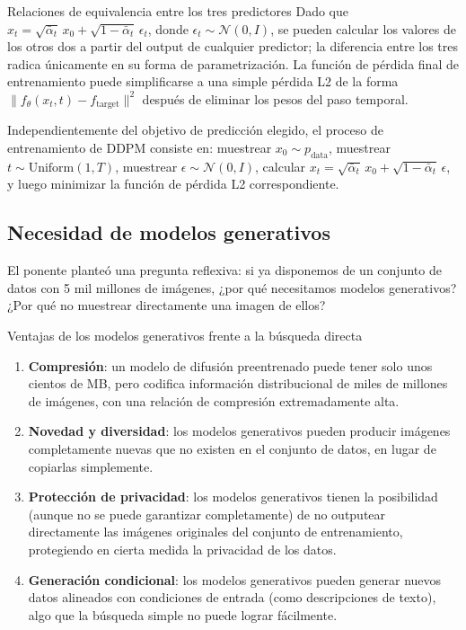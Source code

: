 \begin{knowledgebox}{Relaciones de equivalencia entre los tres predictores}
Dado que $x_t = \sqrt{\bar{\alpha}_t}\, x_0 + \sqrt{1-\bar{\alpha}_t}\, \epsilon_t$, donde $\epsilon_t \sim \mathcal{N}(0, I)$, se pueden calcular los valores de los otros dos a partir del output de cualquier predictor; la diferencia entre los tres radica únicamente en su forma de parametrización. La función de pérdida final de entrenamiento puede simplificarse a una simple pérdida L2 de la forma $\|f_\theta(x_t, t) - f_{\text{target}}\|^2$ después de eliminar los pesos del paso temporal.
\end{knowledgebox}

Independientemente del objetivo de predicción elegido, el proceso de entrenamiento de DDPM consiste en: muestrear $x_0 \sim p_{\text{data}}$, muestrear $t \sim \text{Uniform}(1,T)$, muestrear $\epsilon \sim \mathcal{N}(0,I)$, calcular $x_t = \sqrt{\bar{\alpha}_t}\, x_0 + \sqrt{1-\bar{\alpha}_t}\, \epsilon$, y luego minimizar la función de pérdida L2 correspondiente.

\subsection{Necesidad de modelos generativos}

El ponente planteó una pregunta reflexiva: si ya disponemos de un conjunto de datos con 5 mil millones de imágenes, ¿por qué necesitamos modelos generativos? ¿Por qué no muestrear directamente una imagen de ellos?

\begin{importantbox}{Ventajas de los modelos generativos frente a la búsqueda directa}
\begin{enumerate}
    \item \textbf{Compresión}: un modelo de difusión preentrenado puede tener solo unos cientos de MB, pero codifica información distribucional de miles de millones de imágenes, con una relación de compresión extremadamente alta.
    \item \textbf{Novedad y diversidad}: los modelos generativos pueden producir imágenes completamente nuevas que no existen en el conjunto de datos, en lugar de copiarlas simplemente.
    \item \textbf{Protección de privacidad}: los modelos generativos tienen la posibilidad (aunque no se puede garantizar completamente) de no outputear directamente las imágenes originales del conjunto de entrenamiento, protegiendo en cierta medida la privacidad de los datos.
    \item \textbf{Generación condicional}: los modelos generativos pueden generar nuevos datos alineados con condiciones de entrada (como descripciones de texto), algo que la búsqueda simple no puede lograr fácilmente.
\end{enumerate}
\end{importantbox}


